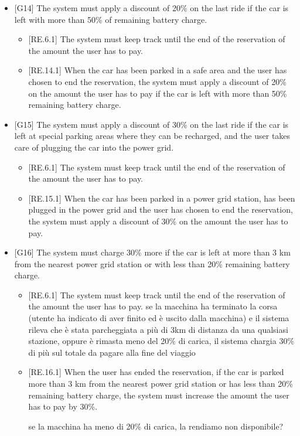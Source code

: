 \documentclass[english]{article}
\begin{document}
\begin{itemize}
\item{[G14] The system must apply a discount of 20\% on the last ride if the car is left with more than 50\% of remaining battery charge.
\begin{itemize}
	\item{[RE.6.1] The system must keep track until the end of the reservation of the amount the user has to pay.}
	\item{[RE.14.1] When the car has been parked in a safe area and the user has chosen to end the reservation, the system must apply a discount of 20\% on the amount the user has to pay if the car is left with more than 50\% remaining battery charge.}
\end{itemize}
}

\item{[G15] The system must apply a discount of 30\% on the last ride if the car is left at special parking areas where they can be recharged, and the user takes care of plugging the car into the power grid.
\begin{itemize}
	\item{[RE.6.1] The system must keep track until the end of the reservation of the amount the user has to pay.}
	\item{[RE.15.1] When the car has been parked in a power grid station, has been plugged in the power grid and the user has chosen to end the reservation, the system must apply a discount of 30\% on the amount the user has to pay.}
\end{itemize}
}

\item{[G16] The system must charge 30\% more if the car is left at more than 3 km from the nearest power grid station or with less than 20\% remaining battery charge.
\begin{itemize}
	\item{[RE.6.1] The system must keep track until the end of the reservation of the amount the user has to pay.}
se la macchina ha terminato la corsa (utente ha indicato di aver finito ed è uscito dalla macchina) e il sistema rileva che è stata parcheggiata a più di 3km di distanza da una qualsiasi stazione, oppure è rimasta meno del 20\% di carica, il sistema chargia 30\% di più sul totale da pagare alla fine del viaggio
	\item{[RE.16.1] When the user has ended the reservation, if the car is parked more than 3 km from the nearest power grid station or has less than 20\% remaining battery charge, the system must increase the amount the user has to pay by 30\%.}
	
se la macchina ha meno di 20\% di carica, la rendiamo non disponibile?
\end{itemize}
}

\end{itemize}
\end{document}
